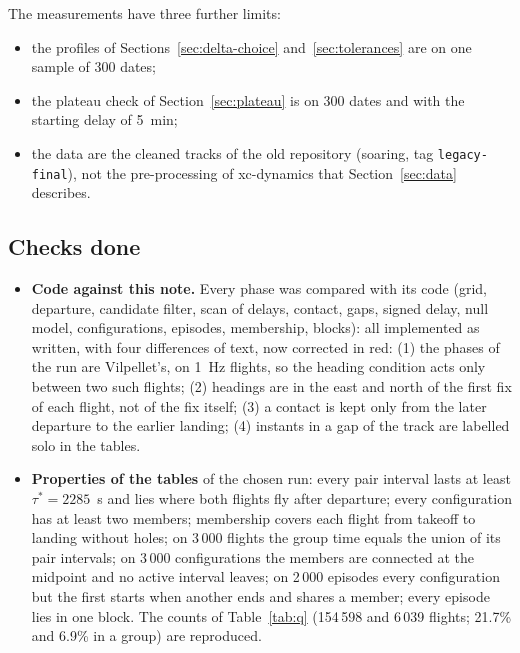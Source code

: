 The measurements have three further limits:
\begin{itemize}
  \item the profiles of Sections~\ref{sec:delta-choice} and~\ref{sec:tolerances} are on one sample
        of 300 dates;
  \item the plateau check of Section~\ref{sec:plateau} is on 300 dates and with the starting delay
        of 5~min;
  \item the data are the cleaned tracks of the old repository (soaring, tag
        \texttt{legacy-final}), not the pre-processing of xc-dynamics that
        Section~\ref{sec:data} describes.
\end{itemize}

\subsection{Checks done}\label{sec:checks-done}

\begin{itemize}
  \item \textbf{Code against this note.} Every phase was compared with its code (grid, departure,
        candidate filter, scan of delays, contact, gaps, signed delay, null model, configurations,
        episodes, membership, blocks): all implemented as written, with four differences of text,
        now corrected in red: (1) the phases of the run are Vilpellet's, on 1~Hz flights, so the
        heading condition acts only between two such flights; (2) headings are in the east and
        north of the first fix of each flight, not of the fix itself; (3) a contact is kept only
        from the later departure to the earlier landing; (4) instants in a gap of the track are
        labelled solo in the tables.
  \item \textbf{Properties of the tables} of the chosen run: every pair interval lasts at least
        $\tau^*=2285$~s and lies where both flights fly after departure; every configuration has at
        least two members; membership covers each flight from takeoff to landing without holes; on
        3\,000 flights the group time equals the union of its pair intervals; on 3\,000
        configurations the members are connected at the midpoint and no active interval leaves; on
        2\,000 episodes every configuration but the first starts when another ends and shares a
        member; every episode lies in one block. The counts of Table~\ref{tab:q} (154\,598 and
        6\,039 flights; 21.7\% and 6.9\% in a group) are reproduced.
\end{itemize}

